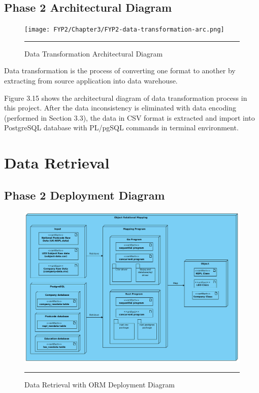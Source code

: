 \subsection{Phase 2 Architectural Diagram}

\begin{figure}[H]
	\centering
	\texttt{[image: FYP2/Chapter3/FYP2-data-transformation-arc.png]}
	\rule{35em}{0.5pt}
	\caption[Data Transformation Architectural Diagram]{Data Transformation Architectural Diagram}
\end{figure} 


Data transformation is the process of converting one format to another by extracting from source application into data warehouse. \cite{data-transformation-definition} 

Figure 3.15 shows the architectural diagram of data transformation process in this project. After the data inconsistency is eliminated with data encoding (performed in Section 3.3), the data in CSV format is extracted and import into PostgreSQL database with PL/pgSQL commands in terminal environment.

\section{Data Retrieval}

\subsection{Phase 2 Deployment Diagram} 

	\begin{figure}[H]
		\centering
		\includegraphics[width=1.0\textwidth]{FYP2/Chapter3/FYP2-ORM-deployment.png}
		\rule{35em}{0.5pt}
	\caption[Data Retrieval with ORM Deployment Diagram]{Data Retrieval with ORM Deployment Diagram}
	\end{figure}


